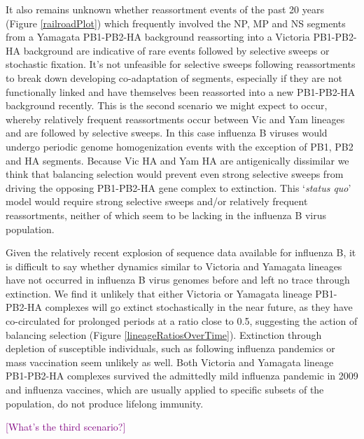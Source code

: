 \documentclass[11pt,oneside,letterpaper]{article}
\def\tbc#1{\textcolor{purple}{[#1]}}
\begin{document}
It also remains unknown whether reassortment events of the past 20 years (Figure \ref{railroadPlot}) which frequently involved the NP, MP and NS segments from a Yamagata PB1-PB2-HA background reassorting into a Victoria PB1-PB2-HA background are indicative of rare events followed by selective sweeps or stochastic fixation.
It's not unfeasible for selective sweeps following reassortments to break down developing co-adaptation of segments, especially if they are not functionally linked and have themselves been reassorted into a new PB1-PB2-HA background recently.
This is the second scenario we might expect to occur, whereby relatively frequent reassortments occur between Vic and Yam lineages and are followed by selective sweeps.
In this case influenza B viruses would undergo periodic genome homogenization events with the exception of PB1, PB2 and HA segments.
Because Vic HA and Yam HA are antigenically dissimilar we think that balancing selection would prevent even strong selective sweeps from driving the opposing PB1-PB2-HA gene complex to extinction.
This `\textit{status quo}' model would require strong selective sweeps and/or relatively frequent reassortments, neither of which seem to be lacking in the influenza B virus population.

Given the relatively recent explosion of sequence data available for influenza B, it is difficult to say whether dynamics similar to Victoria and Yamagata lineages have not occurred in influenza B virus genomes before and left no trace through extinction.
We find it unlikely that either Victoria or Yamagata lineage PB1-PB2-HA complexes will go extinct stochastically in the near future, as they have co-circulated for prolonged periods at a ratio close to 0.5, suggesting the action of balancing selection (Figure \ref{lineageRatiosOverTime}).
Extinction through depletion of susceptible individuals, such as following influenza pandemics or mass vaccination seem unlikely as well.
Both Victoria and Yamagata lineage PB1-PB2-HA complexes survived the admittedly mild influenza pandemic in 2009 and influenza vaccines, which are usually applied to specific subsets of the population, do not produce lifelong immunity.

\tbc{What's the third scenario?}
\end{document}
